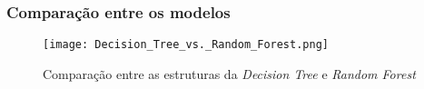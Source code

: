 \begin{frame}
  \frametitle{Comparação entre os modelos}

  \begin{figure}[ht]
    \centering 
    \texttt{[image: Decision\_Tree\_vs.\_Random\_Forest.png]}
    \caption{Comparação entre as estruturas da \emph{Decision Tree} e \emph{Random Forest}}
  \end{figure}
\end{frame}
